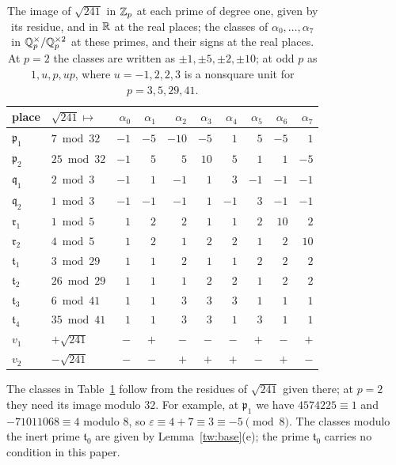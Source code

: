 \begin{table}[htbp]
\centering
\caption{The image of $\sqrt{241}$ in $\mathbb Z_p$ at each prime of degree one,
given by its residue, and in $\mathbb R$ at the real places; the classes of
$\alpha_0,\dots,\alpha_7$ in $\mathbb Q_p^\times/\mathbb Q_p^{\times2}$ at these primes, and
their signs at the real places. At $p=2$ the classes are written as
$\pm1,\pm5,\pm2,\pm10$; at odd $p$ as $1,u,p,up$, where $u=-1,2,2,3$ is a
nonsquare unit for $p=3,5,29,41$.}
\label{tw:squareclass-table}
\begin{tabular}{llrrrrrrrr}
\toprule
place & $\sqrt{241}\mapsto$ & $\alpha_0$ & $\alpha_1$ & $\alpha_2$ & $\alpha_3$ & $\alpha_4$ & $\alpha_5$ & $\alpha_6$ & $\alpha_7$\\
\midrule
$\mathfrak p_1$ & $7\bmod 32$ & $-1$ & $-5$ & $-10$ & $-5$ & $1$ & $5$ & $-5$ & $1$\\
$\mathfrak p_2$ & $25\bmod 32$ & $-1$ & $5$ & $5$ & $10$ & $5$ & $1$ & $1$ & $-5$\\
$\mathfrak q_1$ & $2\bmod 3$ & $-1$ & $1$ & $-1$ & $1$ & $3$ & $-1$ & $-1$ & $-1$\\
$\mathfrak q_2$ & $1\bmod 3$ & $-1$ & $-1$ & $-1$ & $1$ & $-1$ & $3$ & $-1$ & $-1$\\
$\mathfrak r_1$ & $1\bmod 5$ & $1$ & $2$ & $2$ & $1$ & $1$ & $2$ & $10$ & $2$\\
$\mathfrak r_2$ & $4\bmod 5$ & $1$ & $2$ & $1$ & $2$ & $2$ & $1$ & $2$ & $10$\\
$\mathfrak t_1$ & $3\bmod 29$ & $1$ & $1$ & $2$ & $1$ & $1$ & $2$ & $2$ & $2$\\
$\mathfrak t_2$ & $26\bmod 29$ & $1$ & $1$ & $1$ & $2$ & $2$ & $1$ & $2$ & $2$\\
$\mathfrak t_3$ & $6\bmod 41$ & $1$ & $1$ & $3$ & $3$ & $3$ & $1$ & $1$ & $1$\\
$\mathfrak t_4$ & $35\bmod 41$ & $1$ & $1$ & $3$ & $3$ & $1$ & $3$ & $1$ & $1$\\
$v_1$ & $+\sqrt{241}$ & $-$ & $+$ & $-$ & $-$ & $-$ & $+$ & $-$ & $+$\\
$v_2$ & $-\sqrt{241}$ & $-$ & $-$ & $+$ & $+$ & $+$ & $-$ & $+$ & $-$\\
\bottomrule
\end{tabular}
\end{table}

The classes in Table~\ref{tw:squareclass-table} follow from the residues of
$\sqrt{241}$ given there; at $p=2$ they need its image modulo $32$. For
example, at $\mathfrak p_1$ we have $4574225\equiv1$ and $-71011068\equiv4$
modulo $8$, so $\varepsilon\equiv4+7\equiv3\equiv-5\pmod 8$. The classes
modulo the inert prime $\mathfrak t_0$ are given by Lemma~\ref{tw:base}(e);
the prime $\mathfrak t_0$ carries no condition in this paper.

